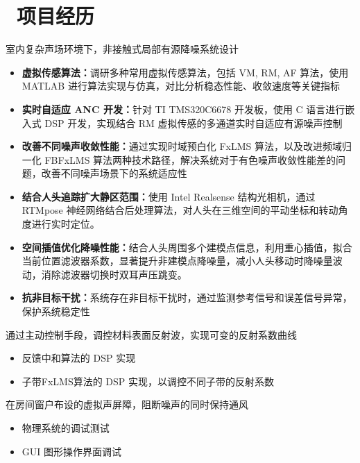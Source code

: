 \documentclass{resume}
\begin{document}
\section{\ 项目经历}
\begin{onehalfspacing}
室内复杂声场环境下，非接触式局部有源降噪系统设计
\begin{itemize}
  \item \textbf{虚拟传感算法：}调研多种常用虚拟传感算法，包括 VM, RM, AF 算法，使用 MATLAB 进行算法实现与仿真，对比分析稳态性能、收敛速度等关键指标
  \item \textbf{实时自适应 ANC 开发：}针对 TI TMS320C6678 开发板，使用 C 语言进行嵌入式 DSP 开发，实现结合 RM 虚拟传感的多通道实时自适应有源噪声控制
  \item \textbf{改善不同噪声收敛性能：}通过实现时域预白化 FxLMS 算法，以及改进频域归一化 FBFxLMS 算法两种技术路径，解决系统对于有色噪声收敛性能差的问题，改善不同噪声场景下的系统适应性
  \item \textbf{结合人头追踪扩大静区范围：}使用 Intel Realsense 结构光相机，通过 RTMpose 神经网络结合后处理算法，对人头在三维空间的平动坐标和转动角度进行实时定位。
  \item \textbf{空间插值优化降噪性能：}结合人头周围多个建模点信息，利用重心插值，拟合当前位置滤波器系数，显著提升非建模点降噪量，减小人头移动时降噪量波动，消除滤波器切换时双耳声压跳变。
  \item \textbf{抗非目标干扰：}系统存在非目标干扰时，通过监测参考信号和误差信号异常，保护系统稳定性
\end{itemize}

通过主动控制手段，调控材料表面反射波，实现可变的反射系数曲线
\begin{itemize}
  \item 反馈中和算法的 DSP 实现
  \item 子带FxLMS算法的 DSP 实现，以调控不同子带的反射系数
\end{itemize}

在房间窗户布设的虚拟声屏障，阻断噪声的同时保持通风
\begin{itemize}
  \item 物理系统的调试测试
  \item GUI 图形操作界面调试
\end{itemize}


\end{onehalfspacing}
\end{document}
